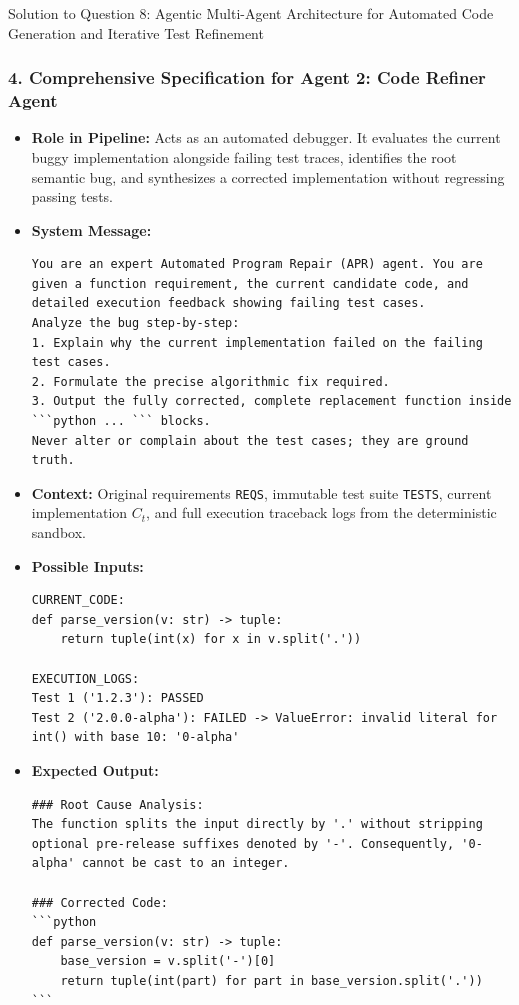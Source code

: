 \documentclass[11pt,a4paper]{article}
\begin{document}
\begin{solutionbox}{Solution to Question 8: Agentic Multi-Agent Architecture for Automated Code Generation and Iterative Test Refinement}
\subsubsection*{4. Comprehensive Specification for Agent 2: Code Refiner Agent}
\begin{itemize}[leftmargin=1.5em]
    \item \textbf{Role in Pipeline:} Acts as an automated debugger. It evaluates the current buggy implementation alongside failing test traces, identifies the root semantic bug, and synthesizes a corrected implementation without regressing passing tests.
    \item \textbf{System Message:}
\begin{lstlisting}[style=diffstyle]
You are an expert Automated Program Repair (APR) agent. You are given a function requirement, the current candidate code, and detailed execution feedback showing failing test cases.
Analyze the bug step-by-step:
1. Explain why the current implementation failed on the failing test cases.
2. Formulate the precise algorithmic fix required.
3. Output the fully corrected, complete replacement function inside ```python ... ``` blocks.
Never alter or complain about the test cases; they are ground truth.
\end{lstlisting}
    \item \textbf{Context:} Original requirements \texttt{REQS}, immutable test suite \texttt{TESTS}, current implementation $C_t$, and full execution traceback logs from the deterministic sandbox.
    \item \textbf{Possible Inputs:}
\begin{lstlisting}[style=diffstyle]
CURRENT_CODE:
def parse_version(v: str) -> tuple:
    return tuple(int(x) for x in v.split('.'))

EXECUTION_LOGS:
Test 1 ('1.2.3'): PASSED
Test 2 ('2.0.0-alpha'): FAILED -> ValueError: invalid literal for int() with base 10: '0-alpha'
\end{lstlisting}
    \item \textbf{Expected Output:}
\begin{lstlisting}[style=diffstyle]
### Root Cause Analysis:
The function splits the input directly by '.' without stripping optional pre-release suffixes denoted by '-'. Consequently, '0-alpha' cannot be cast to an integer.

### Corrected Code:
```python
def parse_version(v: str) -> tuple:
    base_version = v.split('-')[0]
    return tuple(int(part) for part in base_version.split('.'))
```
\end{lstlisting}
\end{itemize}
\end{solutionbox}
\end{document}
